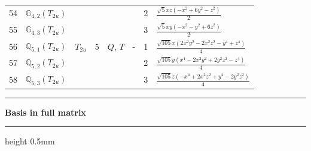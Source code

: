 \documentclass[fleqn,10pt,landscape]{jsarticle}
\begin{document}
\begin{longtable}[l]{clcccccl}
54 & $\mathbb{G}_{4,2}(T_{2u})$ &  &  &  &  & 2 & $\frac{\sqrt{5} x z \left(- x^{2} + 6 y^{2} - z^{2}\right)}{2}$ \\
55 & $\mathbb{G}_{4,3}(T_{2u})$ &  &  &  &  & 3 & $\frac{\sqrt{5} x y \left(- x^{2} - y^{2} + 6 z^{2}\right)}{2}$ \\ \hline
56 & $\mathbb{Q}_{5,1}(T_{2u})$ & $T_{2u}$ & 5 & $Q$, $T$ & - & 1 & $\frac{\sqrt{105} x \left(2 x^{2} y^{2} - 2 x^{2} z^{2} - y^{4} + z^{4}\right)}{4}$ \\
57 & $\mathbb{Q}_{5,2}(T_{2u})$ &  &  &  &  & 2 & $\frac{\sqrt{105} y \left(x^{4} - 2 x^{2} y^{2} + 2 y^{2} z^{2} - z^{4}\right)}{4}$ \\
58 & $\mathbb{Q}_{5,3}(T_{2u})$ &  &  &  &  & 3 & $\frac{\sqrt{105} z \left(- x^{4} + 2 x^{2} z^{2} + y^{4} - 2 y^{2} z^{2}\right)}{4}$ \\
\end{longtable}
\vspace{5mm}
\noindent \rule[0.5mm]{5mm}{0.5mm}\hspace{3mm}\textbf{Basis in full matrix}\hspace{3mm}\leaders\hrule height 0.5mm\hfill\kern0pt
\vspace{3mm}
\end{document}
